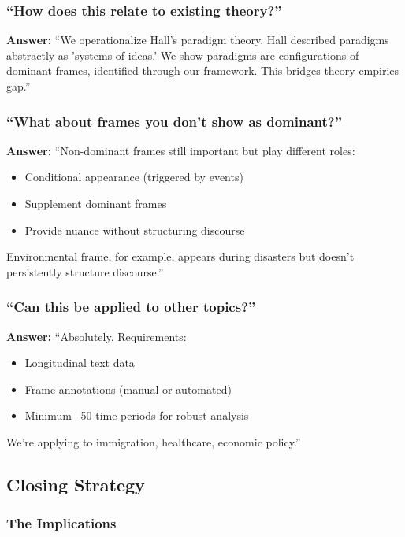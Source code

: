 \documentclass[11pt]{article}
\begin{document}
\subsubsection{``How does this relate to existing theory?''}

\textbf{Answer:} ``We operationalize Hall's paradigm theory. Hall described paradigms abstractly as 'systems of ideas.' We show paradigms are configurations of dominant frames, identified through our framework. This bridges theory-empirics gap.''

\subsubsection{``What about frames you don't show as dominant?''}

\textbf{Answer:} ``Non-dominant frames still important but play different roles:
\begin{itemize}
    \item Conditional appearance (triggered by events)
    \item Supplement dominant frames
    \item Provide nuance without structuring discourse
\end{itemize}
Environmental frame, for example, appears during disasters but doesn't persistently structure discourse.''

\subsubsection{``Can this be applied to other topics?''}

\textbf{Answer:} ``Absolutely. Requirements:
\begin{itemize}
    \item Longitudinal text data
    \item Frame annotations (manual or automated)
    \item Minimum ~50 time periods for robust analysis
\end{itemize}
We're applying to immigration, healthcare, economic policy.''

\subsection{Closing Strategy}

\subsubsection{The Implications}
\end{document}
